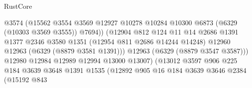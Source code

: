 \begin{lexlean}{RustCore}
\begin{coremodule}
                                            @3574
                                            (@15562
                                              @3554
                                              @3569
                                              @12927
                                              @10278
                                              @10284
                                              @10300
                                              @6873
                                              (@6329 (@10303 @3569 @3555))
                                              @7694))
                                          (@12904
                                            @812
                                            @124
                                            @11
                                            @14
                                            @2686
                                            @1391
                                            @1377
                                            @2346
                                            @3580
                                            @1351
                                            (@12954 @811 @2686 @14244 @14248)
                                            @12960
                                            @12963
                                            (@6329 (@8879 @3581 @1391)))
                                          @12963
                                          (@6329 (@8879 @3547 @3587)))
                                        @12980
                                        @12984
                                        @12989
                                        @12994
                                        @13000
                                        @13007)
                                      (@13012
                                        @3597
                                        @906
                                        @225
                                        @184
                                        @3639
                                        @3648
                                        @1391
                                        @1535
                                        (@12892
                                          @905
                                          @16
                                          @184
                                          @3639
                                          @3646
                                          @2384
                                          (@15192
                                            @843

\end{coremodule}
\end{lexlean}
